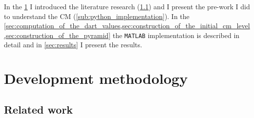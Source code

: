 \documentclass[12pt]{article}
\begin{document}
In the \cref{sec:development_methodology} I introduced the literature research (\cref{sub:related_work}) and I present the pre-work I did to understand the CM (\cref{sub:python_implementation}).
In the \cref{sec:computation_of_the_dart_values,sec:construction_of_the_initial_cm_level,sec:construction_of_the_pyramid} the \texttt{MATLAB} implementation is described in detail and in \cref{sec:results} I present the results.



\section{Development methodology} %
\label{sec:development_methodology}

\subsection{Related work} %
\label{sub:related_work}
\end{document}
